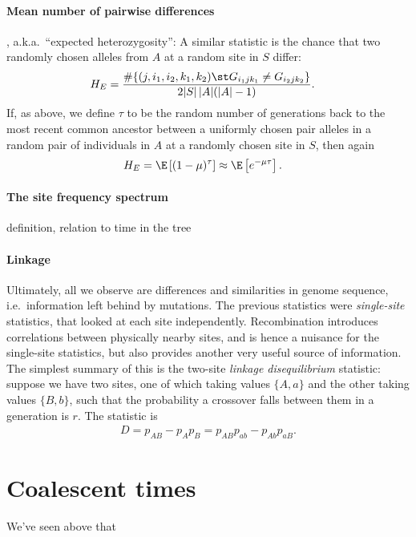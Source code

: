\paragraph{Mean number of pairwise differences}, a.k.a.\ ``expected heterozygosity'':
A similar statistic is the chance that two randomly chosen alleles from $A$ at a random site in $S$ differ:
\begin{align}
  H_E &= \frac{ \#\{ (j,i_1,i_2,k_1,k_2) \st G_{i_1jk_1} \neq G_{i_2jk_2}  \} }{2|S|\,|A|(|A|-1)}  .
\end{align}
If, as above, we define $\tau$ to be the random number of generations back to the most recent common ancestor
between a uniformly chosen pair alleles in a random pair of individuals in $A$ at a randomly chosen site in $S$,
then again
\begin{align}
  H_E &= \E\left[ (1-\mu)^\tau \right] \approx \E\left[ e^{-\mu \tau} \right] .
\end{align}


\paragraph{The site frequency spectrum}
definition, relation to time in the tree



\paragraph{Linkage}
Ultimately, all we observe are differences and similarities in genome sequence,
i.e.\ information left behind by mutations.
The previous statistics were \emph{single-site} statistics,
that looked at each site independently.
Recombination introduces correlations between physically nearby sites,
and is hence a nuisance for the single-site statistics,
but also provides another very useful source of information.
The simplest summary of this is the two-site \emph{linkage disequilibrium} statistic:
suppose we have two sites, one of which taking values $\{A,a\}$ and the other taking values $\{B,b\}$,
such that the probability a crossover falls between them in a generation is $r$.
The statistic is
\begin{align}
  D = p_{AB} - p_A p_B = p_{AB}p_{ab} - p_{Ab}p_{aB} .
\end{align}




\section{Coalescent times}
We've seen above that 



